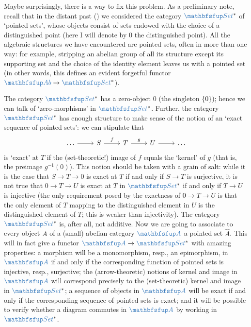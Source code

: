 Maybe surprisingly, there is a way to fix this problem.  As a
preliminary note, recall that in the distant past
() we considered the category
$\categ{Set}^*$ of `pointed sets', whose objects consist of sets
endowed with the choice of a distinguished point (here I will denote
by $0$ the distinguished point). All the algebraic structures we have
encountered are pointed sets, often in more than one way: for example,
stripping an abelian group of all its structure except its supporting
set and the choice of the identity element leaves us with a pointed
set (in other words, this defines an evident forgetful functor
$\categ{Ab} \to \categ{Set}^*$).

The category $\categ{Set}^*$ has a zero-object $0$ (the singleton
$\{0\}$); hence we can talk of `zero-morphisms' in $\categ{Set}^*$.
Further, the category $\categ{Set}^*$ has enough structure to make
sense of the notion of an `exact sequence of pointed sets': we can
stipulate that
\[\begin{tikzcd}
    \dots \arrow[r] & S \arrow[r, "f"] & T \arrow[r, "g"] & U
    \arrow[r] & \dots
  \end{tikzcd}\] is `exact' at $T$ if the (set-theoretic!) image of
$f$ equals the `kernel' of $g$ (that is, the preimage
$g^{-1}(0)$). This notion should be taken with a grain of salt: while
it is the case that $S \to T \to 0$ is exact at $T$ if and only if
$S \to T$ is surjective, it is not true that $0 \to T \to U$ is exact
at $T$ in $\categ{Set}^*$ if and only if $T \to U$ is injective (the
only requirement posed by the exactness of $0 \to T \to U$ is that the
only element of $T$ mapping to the distinguished element in $U$ is the
distinguished element of $T$; this is weaker than injectivity). The
category $\categ{Set}^*$ is, after all, not additive.  Now we are
going to associate to every object $A$ of a (small) abelian category
$\categ{A}$ a pointed set $\hat{A}$. This will in fact give a functor
$\categ{A} \to \categ{Set}^*$ with amazing properties: a morphism will
be a monomorphism, resp., an epimorphism, in $\categ{A}$ if and only
if the corresponding function of pointed sets is injective, resp.,
surjective; the (arrow-theoretic) notions of kernel and image in
$\categ{A}$ will correspond precisely to the (set-theoretic) kernel
and image in $\categ{Set}^*$; a sequence of objects in $\categ{A}$
will be exact if and only if the corresponding sequence of pointed
sets is exact; and it will be possible to verify whether a diagram
commutes in $\categ{A}$ by working in $\categ{Set}^*$.

